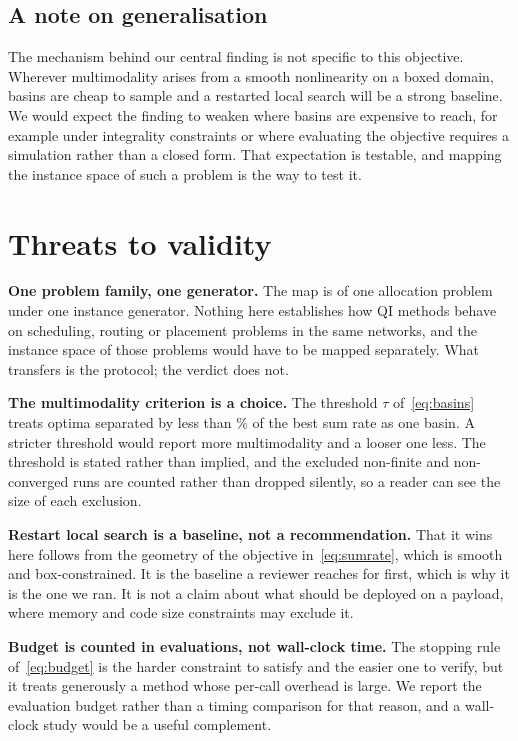 \documentclass[runningheads]{llncs}
\begin{document}
\subsection{A note on generalisation}

The mechanism behind our central finding is not specific to this objective. Wherever multimodality
arises from a smooth nonlinearity on a boxed domain, basins are cheap to sample and a restarted
local search will be a strong baseline. We would expect the finding to weaken where basins are
expensive to reach, for example under integrality constraints or where evaluating the objective
requires a simulation rather than a closed form. That expectation is testable, and mapping the
instance space of such a problem is the way to test it.

\section{Threats to validity}
\label{sec:threats}

\textbf{One problem family, one generator.} The map is of one allocation problem under one
instance generator. Nothing here establishes how QI methods behave on scheduling, routing or
placement problems in the same networks, and the instance space of those problems would have to
be mapped separately. What transfers is the protocol; the verdict does not.

\textbf{The multimodality criterion is a choice.} The threshold $\tau$ of~\eqref{eq:basins}
treats optima separated by less than \numMinSpread\% of the best sum rate as one basin. A stricter threshold would report more
multimodality and a looser one less. The threshold is stated rather than implied, and the
excluded non-finite and non-converged runs are counted rather than dropped silently, so a reader
can see the size of each exclusion.

\textbf{Restart local search is a baseline, not a recommendation.} That it wins here follows from
the geometry of the objective in~\eqref{eq:sumrate}, which is smooth and box-constrained. It is the baseline a
reviewer reaches for first, which is why it is the one we ran. It is not a claim about what
should be deployed on a payload, where memory and code size constraints may exclude it.

\textbf{Budget is counted in evaluations, not wall-clock time.} The stopping rule
of~\eqref{eq:budget} is the harder constraint to satisfy and the easier one to verify, but it treats generously a method whose
per-call overhead is large. We report the evaluation budget rather than a timing comparison for
that reason, and a wall-clock study would be a useful complement.
\end{document}
